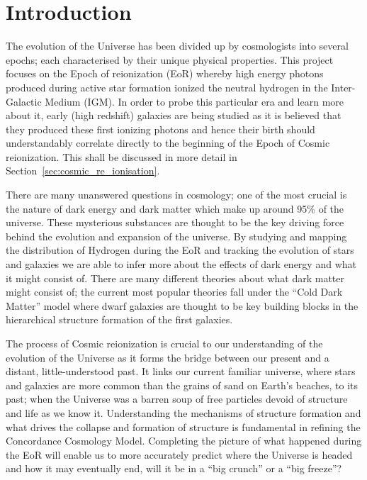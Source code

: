 
\newpage
\section{Introduction} %
\label{section:Introduction}
	The evolution of the Universe has been divided up by cosmologists into several epochs; each characterised by their unique physical properties. This project focuses on the Epoch of reionization (EoR) whereby high energy photons produced during active star formation ionized the neutral hydrogen in the Inter-Galactic Medium (IGM). In order to probe this particular era and learn more about it, early (high redshift) galaxies are being studied as it is believed that they produced these first ionizing photons and hence their birth should understandably correlate directly to the beginning of the Epoch of Cosmic reionization. This shall be discussed in more detail in Section~\ref{sec:cosmic_re_ionisation}.

	There are many unanswered questions in cosmology; one of the most crucial is the nature of dark energy and dark matter which make up around 95\% of the universe\cite{WMAP9}. These mysterious substances are thought to be the key driving force behind the evolution and expansion of the universe. By studying and mapping the distribution of Hydrogen during the EoR and tracking the evolution of stars and galaxies we are able to infer more about the effects of dark energy and what it might consist of. There are many different theories about what dark matter might consist of; the current most popular theories fall under the ``Cold Dark Matter'' model where dwarf galaxies are thought to be key building blocks in the hierarchical structure formation of the first galaxies\cite{Cignoni}.

	The process of Cosmic reionization is crucial to our understanding of the evolution of the Universe as it forms the bridge between our present and a distant, little-understood past. It links our current familiar universe, where stars and galaxies are more common than the grains of sand on Earth's beaches, to its past; when the Universe was a barren soup of free particles devoid of structure and life as we know it. Understanding the mechanisms of structure formation and what drives the collapse and formation of structure is fundamental in refining the Concordance Cosmology Model. Completing the picture of what happened during the EoR will enable us to more accurately predict where the Universe is headed and how it may eventually end, will it be in a ``big crunch'' or a ``big freeze''?

